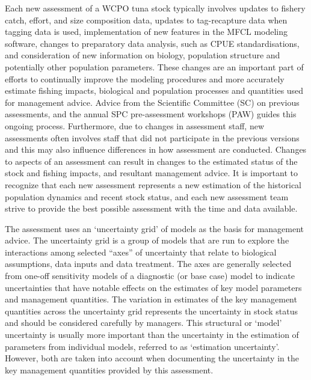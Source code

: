 Each new assessment of a WCPO tuna stock typically involves updates to fishery catch, effort, and size composition data, updates to tag-recapture data when tagging data is used, implementation of new features in the MFCL modeling software, changes to preparatory data analysis, such as CPUE standardisations, and consideration of new information on biology, population structure and potentially other population parameters. These changes are an important part of efforts to continually improve the modeling procedures and more accurately estimate fishing impacts, biological and population processes and quantities used for management advice. Advice from the Scientific Committee (SC) on previous assessments, and the annual SPC pre-assessment workshops (PAW) \citep{hamer_report_2023} guides this ongoing process. Furthermore, due to changes in assessment staff, new assessments often involves staff that did not participate in the previous versions and this may also influence differences in how assessment are conducted. Changes to aspects of an assessment can result in changes to the estimated status of the stock and fishing impacts, and resultant management advice. It is important to recognize that each new assessment represents a new estimation of the historical population dynamics and recent stock status, and each new assessment team strive to provide the best possible assessment with the time and data available.

The assessment uses an `uncertainty grid' of models as the basis for management advice. The uncertainty grid is a group of models that are run to explore the interactions among selected \enquote{axes} of uncertainty that relate to biological assumptions, data inputs and data treatment. The axes are generally selected from one-off sensitivity models of a diagnostic (or base case) model to indicate uncertainties that have notable effects on the estimates of key model parameters and management quantities. The variation in estimates of the key management quantities across the uncertainty grid represents the uncertainty in stock status and should be considered carefully by managers. This structural or `model' uncertainty is usually more important than the uncertainty in the estimation of parameters from individual models, referred to as `estimation uncertainty'. However, both are taken into account when documenting the uncertainty in the key management quantities provided by this assessment.

